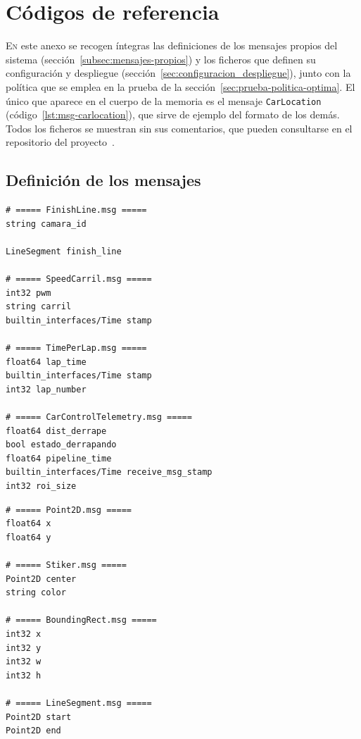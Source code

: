 \chapter{Códigos de referencia}
\label{chap:listados}

\lettrine{E}{n} este anexo se recogen íntegras las definiciones de los mensajes propios del sistema (sección~\ref{subsec:mensajes-propios}) y los ficheros que definen su configuración y despliegue (sección~\ref{sec:configuracion_despliegue}), junto con la política que se emplea en la prueba de la sección~\ref{sec:prueba-politica-optima}. El único que aparece en el cuerpo de la memoria es el mensaje \texttt{CarLocation} (código~\ref{lst:msg-carlocation}), que sirve de ejemplo del formato de los demás. Todos los ficheros se muestran sin sus comentarios, que pueden consultarse en el repositorio del proyecto~\cite{repogithub}.

\section{Definición de los mensajes}
\label{sec:anexo-mensajes}

\begin{lstlisting}[style=codigo, language=rosmsg, caption={Definición de los mensajes que transportan la información del sistema}, label={lst:msgs-informacion}]
# ===== FinishLine.msg =====
string camara_id

LineSegment finish_line

# ===== SpeedCarril.msg =====
int32 pwm
string carril
builtin_interfaces/Time stamp

# ===== TimePerLap.msg =====
float64 lap_time
builtin_interfaces/Time stamp
int32 lap_number

# ===== CarControlTelemetry.msg =====
float64 dist_derrape
bool estado_derrapando
float64 pipeline_time
builtin_interfaces/Time receive_msg_stamp
int32 roi_size
\end{lstlisting}

\newpage
\begin{lstlisting}[style=codigo, language=rosmsg, caption={Definición de los mensajes auxiliares}, label={lst:msgs-auxiliares}]
# ===== Point2D.msg =====
float64 x
float64 y

# ===== Stiker.msg =====
Point2D center
string color

# ===== BoundingRect.msg =====
int32 x
int32 y
int32 w
int32 h

# ===== LineSegment.msg =====
Point2D start
Point2D end
\end{lstlisting}


